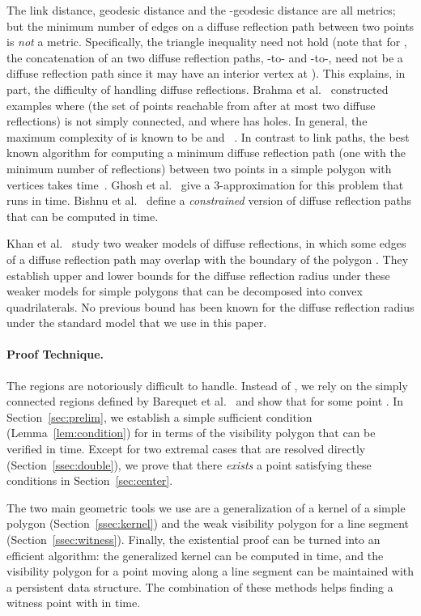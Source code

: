 \documentclass[12pt]{article}
\begin{document}
The link distance, geodesic distance and the -geodesic distance are all metrics; but the minimum number of edges on a diffuse reflection path between two points is \emph{not} a metric. Specifically, the triangle inequality need not hold (note that for , the concatenation of an two diffuse reflection paths, -to- and -to-, need not be a diffuse reflection path since it may have an interior vertex at ). This explains, in part, the difficulty of handling diffuse reflections.
Brahma et al.~\cite{BPS04} constructed examples where  (the set of points reachable from  after at most two diffuse reflections) is not simply connected, and where  has  holes. In general, the maximum complexity of  is known to be  and ~\cite{ADI+06}. In contrast to link paths, the best known algorithm for computing a minimum diffuse reflection path (one with the minimum number of reflections) between two points in a simple polygon with  vertices takes  time~\cite{ADI+06,G07}.
Ghosh et al.~\cite{GGM+12} give a 3-approximation for this problem that runs in  time. Bishnu et al.~\cite{BGG+14} define a \emph{constrained} version of diffuse reflection paths that can be computed in  time.

Khan et al.~\cite{KPA+13} study two weaker models of diffuse reflections, in which some edges of a diffuse reflection path may overlap with the boundary of the polygon . They establish upper and lower bounds for
the diffuse reflection radius under these weaker models for simple polygons that can be decomposed into convex quadrilaterals. No previous bound has been known for the diffuse reflection radius under the standard model that we use in this paper.

\paragraph{\bf Proof Technique.}
The regions  are notoriously difficult to handle. Instead of , we rely on the simply connected regions  defined by Barequet et al.~\cite{Us} and show that  for some point . In Section~\ref{sec:prelim}, we establish a simple sufficient condition (Lemma~\ref{lem:condition}) for  in terms of the visibility polygon  that can be verified in  time. Except for two extremal cases that are resolved directly (Section~\ref{ssec:double}), we prove that there \emph{exists} a point satisfying these conditions in Section~\ref{sec:center}.

The two main geometric tools we use are a generalization of a kernel of a simple polygon (Section~\ref{ssec:kernel}) and the weak visibility polygon for a line segment (Section~\ref{ssec:witness}). Finally, the existential proof can be turned into an efficient algorithm: the generalized kernel can be computed in  time, and the visibility polygon for a point moving along a line segment can be maintained with a persistent data structure. The combination of these methods helps finding a witness point  with   in  time.
\end{document}
